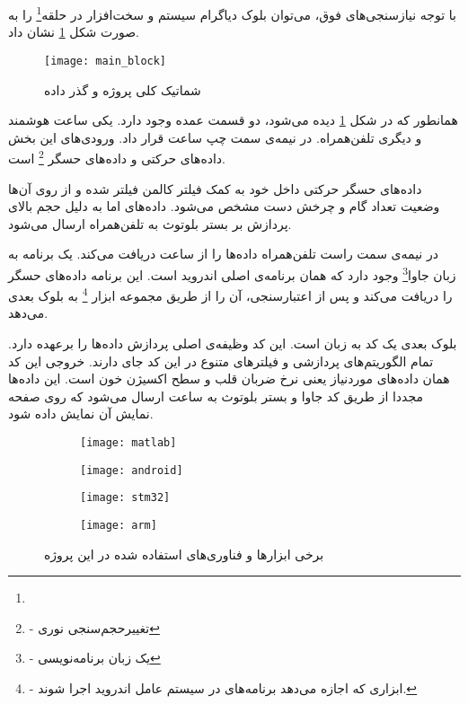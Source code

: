 با توجه نیازسنجی‌های فوق، می‌توان بلوک دیاگرام سیستم و سخت‌افزار در حلقه\footnote{}
را به صورت شکل \ref{fig:main-block} نشان داد.
\newpage
\begin{figure}[h!]
	\centering
	\texttt{[image: main\_block]}
	\caption{شماتیک کلی پروژه و گذر داده}
	\label{fig:main-block}
\end{figure}
\newpage

همانطور که در شکل \ref{fig:main-block} دیده می‌شود، دو قسمت عمده وجود دارد. یکی ساعت هوشمند و دیگری تلفن‌همراه. در نیمه‌ی سمت چپ ساعت قرار داد. ورودی‌های این بخش داده‌های حرکتی و داده‌های حسگر
\footnote{ - تغییرحجم‌سنجی نوری}
است.

داده‌های حسگر حرکتی داخل خود به کمک فیلتر کالمن فیلتر شده و از روی آن‌ها وضعیت تعداد گام و چرخش دست مشخص می‌شود. داده‌های  اما به دلیل حجم بالای پردازش بر بستر بلوتوث به تلفن‌همراه ارسال می‌شود.

در نیمه‌ی سمت راست تلفن‌همراه داده‌ها را از ساعت دریافت می‌کند. یک برنامه به زبان جاوا\footnote{ - یک زبان برنامه‌نویسی} وجود دارد که همان برنامه‌ی اصلی اندروید است. این برنامه داده‌های حسگر را دریافت می‌کند و پس از اعتبارسنجی، آن را از طریق مجموعه ابزار
\footnote{ - ابزاری که اجازه می‌دهد برنامه‌های  در سیستم عامل اندروید اجرا شوند.}
به بلوک بعدی می‌دهد.

بلوک بعدی یک کد به زبان  است. این کد وظیفه‌ی اصلی پردازش داده‌ها را برعهده دارد. تمام الگوریتم‌های پردازشی و فیلترهای متنوع در این کد جای دارند. خروجی این کد همان داده‌های موردنیاز یعنی نرخ ضربان قلب و سطح اکسیژن خون است. این داده‌ها مجددا از طریق کد جاوا و بستر بلوتوث به ساعت ارسال می‌شود که روی صفحه نمایش آن نمایش داده شود.

 \begin{figure}[h]
	\centering
	\begin{subfigure}{0.24\textwidth}
		\centering
		\texttt{[image: matlab]}
		\caption{}
	\end{subfigure}
	\begin{subfigure}{0.24\textwidth}
		\centering
		\texttt{[image: android]}
		\caption{}
	\end{subfigure}
	\begin{subfigure}{0.24\textwidth}
		\centering
		\texttt{[image: stm32]}
		\caption{}
	\end{subfigure}
	\begin{subfigure}{0.24\textwidth}
		\centering
		\texttt{[image: arm]}
		\caption{}
	\end{subfigure}
	\caption{برخی ابزارها و فناوری‌های استفاده شده در این پروژه}
	\label{fig:techs}
\end{figure}

